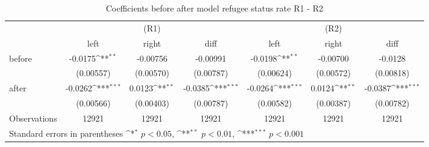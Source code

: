 \begin{table}[!ht]\centering \footnotesize
\def\sym#1{\ifmmode^{#1}\else\(^{#1}\)\fi}
\caption{Coefficients before after model refugee status rate R1 - R2}
\begin{tabular}{l*{6}{c}}
\hline\hline
                    &\multicolumn{3}{c}{(R1)}&\multicolumn{3}{c}{(R2)}\\
&\multicolumn{1}{c}{left}&\multicolumn{1}{c}{right}&\multicolumn{1}{c}{diff}&\multicolumn{1}{c}{left}&\multicolumn{1}{c}{right}&\multicolumn{1}{c}{diff}\\
\hline
before              &     -0.0175\sym{**} &    -0.00756         &    -0.00991         &     -0.0198\sym{**} &    -0.00700         &     -0.0128         \\
                    &   (0.00557)         &   (0.00570)         &   (0.00787)         &   (0.00624)         &   (0.00572)         &   (0.00818)         \\
[0,5em]
after               &     -0.0262\sym{***}&      0.0123\sym{**} &     -0.0385\sym{***}&     -0.0264\sym{***}&      0.0124\sym{**} &     -0.0387\sym{***}\\
                    &   (0.00566)         &   (0.00403)         &   (0.00787)         &   (0.00582)         &   (0.00387)         &   (0.00782)         \\
\hline
Observations        &       12921         &       12921         &       12921         &       12921         &       12921         &       12921         \\
\hline\hline
\multicolumn{7}{l}{\footnotesize Standard errors in parentheses \sym{*} \(p<0.05\), \sym{**} \(p<0.01\), \sym{***} \(p<0.001\)}\\
\end{tabular}
\end{table}
